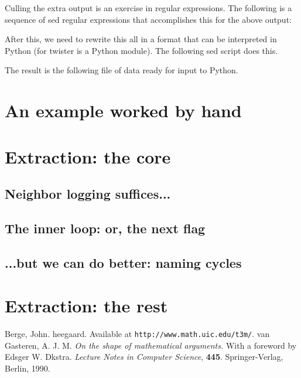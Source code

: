 \documentclass{article}%
\theoremstyle{plain}
\theoremstyle{plain}
\theoremstyle{definition}
\numberwithin{equation}{section}
\begin{document}
Culling the extra output is an exercise in regular
expressions. The following is a sequence of {\Tt{}sed\nwendquote}
regular expressions that accomplishes this
for the above output:
\nwenddocs{}\endmoddef\nwstartdeflinemarkup\nwenddeflinemarkup

\nwendcode{}\nwdocspar
After this, we need to rewrite this all in a format
that can be interpreted in Python (for {\Tt{}twister\nwendquote} is
a Python module). The following {\Tt{}sed\nwendquote} script does this.
\nwenddocs{}\endmoddef\nwstartdeflinemarkup\nwenddeflinemarkup

\nwendcode{}\nwdocspar
The result is the following file of data ready
for input to Python.
\nwenddocs{}\endmoddef\nwstartdeflinemarkup\nwenddeflinemarkup

\nwendcode{}\nwdocspar
\section{An example worked by hand}
\section{Extraction: the core}
\subsection{Neighbor logging suffices...}
\subsection{The inner loop: or, the next flag}
\subsection{...but we can do better: naming cycles}
\section{Extraction: the rest}
\begin{thebibliography}{9}
Berge, John. {\Tt{}heegaard\nwendquote}. Available at 
\texttt{http://www.math.uic.edu/t3m/}.
van Gasteren, A. J. M. \emph{On the shape of mathematical arguments.}
With a foreword by Edsger W. D{\ij}kstra. \emph{Lecture Notes in
Computer Science}, \textbf{445}. Springer-Verlag, Berlin, 1990.
\end{thebibliography}
\nwenddocs{}\nwdocspar
\end{document}
